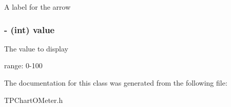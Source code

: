A label for the arrow \hypertarget{interface_t_p_chart_o_meter_f28c79861d8123f6294791942243c0aa}{
\subsubsection[{value}]{\setlength{\rightskip}{0pt plus 5cm}- (int) value}}
\label{interface_t_p_chart_o_meter_f28c79861d8123f6294791942243c0aa}


The value to display\par
 range: 0-100 

The documentation for this class was generated from the following file:\begin{CompactItemize}
\item 
TPChartOMeter.h\end{CompactItemize}
